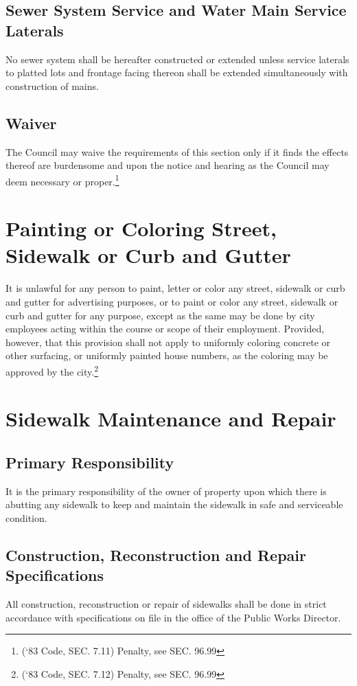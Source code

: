 \subsection{Sewer System Service and Water Main Service Laterals}
No sewer system shall be hereafter constructed or extended unless service laterals to platted lots and frontage facing thereon shall be extended simultaneously with construction of mains.
\subsection{Waiver}
The Council may waive the requirements of this section only if it finds the effects thereof are burdensome and upon the notice and hearing as the Council may deem necessary or proper.\footnote{(‘83 Code, SEC. 7.11)  Penalty, see SEC. 96.99}

\section{Painting or Coloring Street, Sidewalk or Curb and Gutter}
It is unlawful for any person to paint, letter or color any street, sidewalk or curb and gutter for advertising purposes, or to paint or color any street, sidewalk or curb and gutter for any purpose, except as the same may be done by city employees acting within the course or scope of their employment. Provided, however, that this provision shall not apply to uniformly coloring concrete or other surfacing, or uniformly painted house numbers, as the coloring may be approved by the city.\footnote{(‘83 Code, SEC. 7.12)  Penalty, see SEC. 96.99}

\section{Sidewalk Maintenance and Repair}
\subsection{Primary Responsibility}
It is the primary responsibility of the owner of property upon which there is abutting any sidewalk to keep and maintain the sidewalk in safe and serviceable condition.
\subsection{Construction, Reconstruction and Repair Specifications}
All construction, reconstruction or repair of sidewalks shall be done in strict accordance with specifications on file in the office of the Public Works Director.
